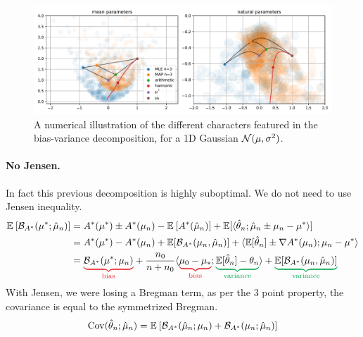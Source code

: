 \documentclass{article}
\newcommand*{\expect}[2][]{\ensuremath{\mathbb{E}_{#1} \left[ #2 \right] }} %
\newcommand{\logpart}{A}
\newcommand{\conj}{\logpart^*}
\newcommand{\bregmanconj}{\cB_{\logpart^*}}
\newcommand{\natp}{\theta}
\newcommand{\MAPm}{\hat \mu_n}
\begin{document}
\begin{figure}[ht]
	\centering
	\includegraphics[width=\textwidth]{figs/numerical_schema_n=3.pdf}
	\caption{A numerical illustration of the different characters featured in the bias-variance decomposition, for a 1D Gaussian ${\mathcal N}(\mu, \sigma^2)$.}
	\label{fig:bias-variance-numerical}
\end{figure}

\paragraph{No Jensen.}
In fact this previous decomposition is highly suboptimal. 
We do not need to use Jensen inequality.
\begin{align}
	\expect{\bregmanconj(\mu^* ; \hat \mu_n)} 
	&= \conj(\mu^* ) 
	\pm \conj(\mu_n)
	-  \expect{\conj(\hat \mu_n)}
	+ \E[\langle \hat \natp_n ; \hat \mu_n   \pm \mu_n - \mu^*  \rangle ] \\
	&= \conj(\mu^* ) 
	- \conj(\mu_n)  + \E[\bregmanconj(\mu_n, \MAPm)]
	+ \langle \E[\hat \natp_n] \pm \nabla \conj(\mu_n) ;  \mu_n - \mu^* \rangle
	\nonumber\\
	& = \bias{\bregmanconj(\mu^*; \mu_n)}
	+ \frac{n_0}{n+n_0} \langle  \bias{\mu_0 - \mu_*} ; \variance{\E[\hat \natp_n] - \natp_n} \rangle 
	+ \variance{\E[\bregmanconj(\mu_n, \MAPm)]}
\end{align}
With Jensen, we were losing a Bregman term, as per the 3 point property, the covariance is equal to the symmetrized Bregman.
\begin{align}
	\Cov(\hat \natp_n ; \hat \mu_n )  
	=\expect{\bregmanconj(\MAPm ; \mu_n)
	+ \bregmanconj(\mu_n ; \MAPm)}
\end{align}
\end{document}
